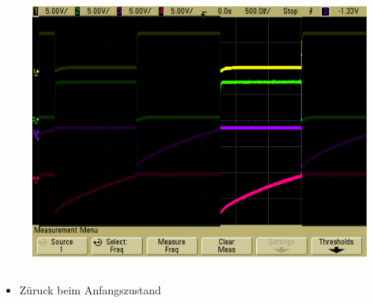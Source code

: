 \begin{frame}
\begin{columns}[c]
\begin{figure}[H]
\begin{center}
            \includegraphics[scale=0.12]{./img/oszi/blink_shade_3.png}
    \end{center}
    \end{figure}
    \end{columns}
    \begin{block}{}
         \begin{itemize}
         \item Züruck beim Anfangszustand
         \end{itemize}
    \end{block}
\end{frame}
